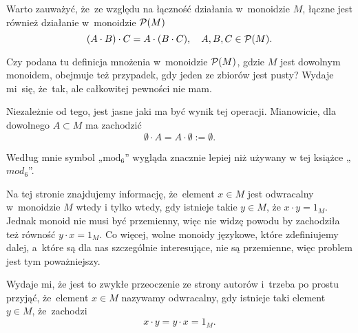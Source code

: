 \documentclass[a4paper,11pt]{article}
\begin{document}
\vspace{\spaceFour}







\start {} Warto zauważyć, że~ze względu na łączność działania
w~monoidzie $M$, łączne jest również działanie w~monoidzie $\mathcal{P}( M )$
\begin{equation}
  \label{eq:Forys-Forys-01}
  ( A \cdot B ) \cdot C = A \cdot ( B \cdot C ), \quad
  A, B, C \in \mathcal{P}( M ).
\end{equation}

\vspace{\spaceFour}





\start {} Czy podana tu definicja mnożenia w~monoidzie $\mathcal{P}( M )$,
gdzie $M$ jest dowolnym monoidem, obejmuje też przypadek, gdy jeden ze
zbiorów jest pusty? Wydaje mi~się, że~tak, ale całkowitej pewności nie mam.

Niezależnie od tego, jest jasne jaki ma być wynik tej operacji. Mianowicie, dla dowolnego $A \subset M$ ma zachodzić
\begin{equation}
  \label{eq:Forys-Forys-???}
  \emptyset \cdot A = A \cdot \emptyset := \emptyset.
\end{equation}

\vspace{\spaceFour}





\start {} Według mnie symbol „$\textrm{mod}_{ 6 }$” wygląda
znacznie lepiej niż używany w tej książce „$mod_{ 6 }$”.

\vspace{\spaceFour}





\start {} Na tej stronie znajdujemy informację, że~element
$x \in M$ jest odwracalny w~monoidzie $M$ wtedy i tylko wtedy, gdy
istnieje takie $y \in M$, że $x \cdot y = 1_{ M }$. Jednak monoid nie
musi być przemienny, więc nie widzę powodu by zachodziła też równość
$y \cdot x = 1_{ M }$. Co więcej, wolne monoidy językowe, które
zdefiniujemy dalej, a~które są dla nas szczególnie interesujące, nie
są przemienne, więc problem jest tym poważniejszy.

Wydaje mi, że jest to zwykłe przeoczenie ze strony autorów i~trzeba po
prostu przyjąć, że~element $x \in M$ nazywamy odwracalny, gdy istnieje
taki element $y \in M$, że~zachodzi
\begin{equation}
  \label{eq:Forys-Forys-02}
  x \cdot y = y \cdot x = 1_{ M }.
\end{equation}
\end{document}
